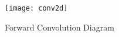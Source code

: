 \begin{figure}[!h]
  \centering
  \texttt{[image: conv2d]}

    

    




    
  \caption{Forward Convolution Diagram}
  \label{fig:conv2d}
\end{figure}

